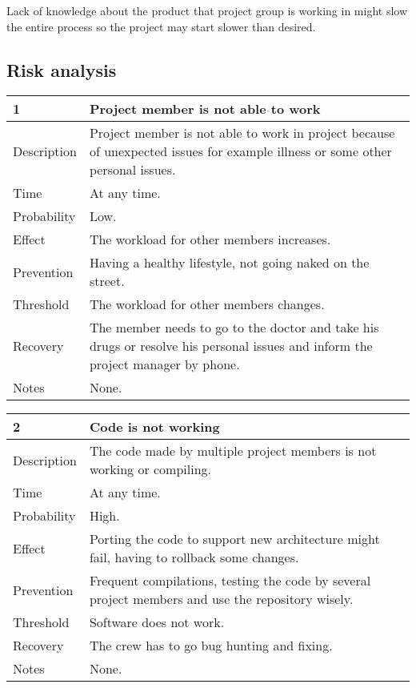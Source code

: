 \documentclass[12pt,titlepage]{article}
\begin{document}
	Lack of knowledge about the product that project group is working in might slow the entire process so the project may start slower than desired. 
 
	\subsection{Risk analysis}

		\begin{center}
		\begin{tabular}{|l|p{10cm}|}
			\hline
			\textbf{1} & \textbf{Project member is not able to work} \\
			\hline
			\hline
			Description & Project member is not able to work in project because of unexpected issues for example illness or some other personal issues. \\
			\hline
			Time & At any time. \\
			\hline
			Probability & Low. \\
			\hline
			Effect & The workload for other members increases. \\
			\hline
			Prevention & Having a healthy lifestyle, not going naked on the street. \\
			\hline
			Threshold & The workload for other members changes. \\
			\hline
			Recovery & The member needs to go to the doctor and take his drugs or resolve his personal issues and inform the project manager by phone. \\
			\hline
			Notes & None. \\
			\hline
		\end{tabular}
		\end{center}
	
		\begin{center}
		\begin{tabular}{|l|p{10cm}|}
			\hline
			\textbf{2} & \textbf{Code is not working} \\
			\hline
			\hline
			Description & The code made by multiple project members is not working or compiling. \\
			\hline
			Time & At any time. \\
			\hline
			Probability & High. \\
			\hline
			Effect & Porting the code to support new architecture might fail, having to rollback some changes. \\
			\hline
			Prevention & Frequent compilations, testing the code by several project members and use the repository wisely. \\
			\hline
			Threshold & Software does not work. \\
			\hline
			Recovery & The crew has to go bug hunting and fixing. \\
			\hline
			Notes & None. \\
			\hline
		\end{tabular}
		\end{center}
\end{document}

